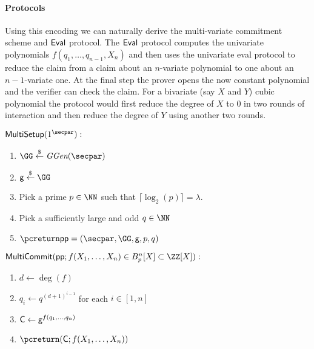 \documentclass{article}
\theoremstyle{definition}
\begin{document}
\paragraph{Protocols}
 Using this encoding we can naturally derive the multi-variate commitment scheme and $\textsf{{Eval}}$ protocol. The $\textsf{{Eval}}$ protocol computes the univariate polynomials $f(q_1,\dots,q_{n-1},X_n)$ and then uses the univariate eval protocol to reduce the claim from a claim about an $n$-variate polynomial to one about an $n-1$-variate one. At the final step the prover opens the now constant polynomial and the verifier can check the claim. For a bivariate (say $X$ and $Y$) cubic polynomial the protocol would first reduce the degree of $X$ to $0$ in two rounds of interaction and then reduce the degree of $Y$ using another two rounds.
 
 \begin{mdframed}[userdefinedwidth=\textwidth]
\begin{minipage}{\textwidth}
	\begin{flushleft}
	$\pro{MultiSetup}(1^\secpar):$
		\begin{enumerate}[nolistsep]
			\item $ \GG \sample \ggen(\secpar)$
			\item $ \gr{g} \sample \GG$
			\item Pick a prime $p\in \NN$ such that $\lceil\log_2(p)\rceil=\lambda$.
			\item Pick a sufficiently large and odd $q\in \NN$ 
			\item $\pcreturn \params = (\secpar,\GG,\gr{g},p,q)$
		\end{enumerate}
	$\pro{MultiCommit}(\crs;f(X_1,\dots,X_n) \in B_{p}^n[X]\subset \ZZ[X]):$ 		\begin{enumerate}[nolistsep]
			\item $d\gets \deg(f)$
			\item $q_i\gets q^{(d+1)^{i-1}}$ for each $i\in [1,n]$
			\item $\mathsf{C} \gets \mathsf{g}^{f(q_1,\dots,q_n)}$
			\item $\pcreturn (\gr{C};f(X_1,\dots,X_n))$
		\end{enumerate}
			\end{flushleft}
\end{minipage}
\end{mdframed}
 
\end{document}
